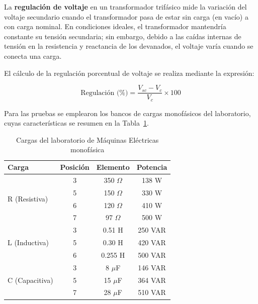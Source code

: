 La \textbf{regulación de voltaje} en un transformador trifásico mide la variación del voltaje secundario cuando el transformador pasa de estar sin carga (en vacío) a con carga nominal. En condiciones ideales, el transformador mantendría constante su tensión secundaria; sin embargo, debido a las caídas internas de tensión en la resistencia y reactancia de los devanados, el voltaje varía cuando se conecta una carga.

El cálculo de la regulación porcentual de voltaje se realiza mediante la expresión:

\begin{equation}
    \label{eq:regulacion} %
    \text{Regulación (\%)} = \frac{V_{sc} - V_c}{V_c} \times 100
\end{equation}

Para las pruebas se emplearon los bancos de cargas monofásicos del laboratorio, cuyas características se resumen en la Tabla~\ref{tab:cargas}.

\begin{table} %
\centering
\caption{Cargas del laboratorio de Máquinas Eléctricas monofásica}
\label{tab:cargas}
\footnotesize
\setlength{\tabcolsep}{2.5pt} %
\begin{tabular}{|l|c|c|c|}
\hline
\textbf{Carga} & \textbf{Posición} & \textbf{Elemento} & \textbf{Potencia} \\ \hline

\multirow{4}{*}{R (Resistiva)} %
& 3 & 350 $\Omega$ & 138 W \\ \cline{2-4}
& 5 & 150 $\Omega$ & 330 W \\ \cline{2-4}
& 6 & 120 $\Omega$ & 410 W \\ \cline{2-4}
& 7 & 97 $\Omega$ & 500 W \\ \hline

\multirow{3}{*}{L (Inductiva)} %
& 3 & 0.51 H & 250 VAR \\ \cline{2-4}
& 5 & 0.30 H & 420 VAR \\ \cline{2-4}
& 6 & 0.255 H & 500 VAR \\ \hline

\multirow{3}{*}{C (Capacitiva)} %
& 3 & 8 $\mu$F & 146 VAR \\ \cline{2-4}
& 5 & 15 $\mu$F & 364 VAR \\ \cline{2-4}
& 7 & 28 $\mu$F & 510 VAR \\ \hline
\end{tabular}
\end{table}

